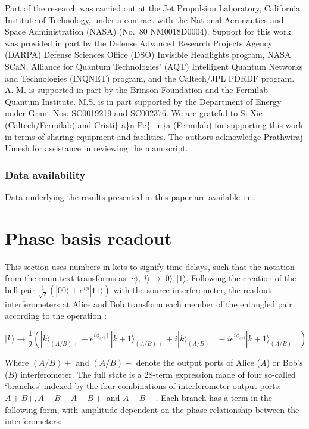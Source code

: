\documentclass[11pt]{caltech_thesis} %
\begin{document}
Part of the research was carried out at the Jet Propulsion Laboratory, California Institute of Technology, under a contract with the National Aeronautics and Space Administration (NASA) (No.~80 NM0018D0004). Support for this work was provided in part by the Defense Advanced Research Projects Agency (DARPA) Defense Sciences Office (DSO) Invisible Headlights program, NASA SCaN, Alliance for Quantum Technologies' (AQT) Intelligent Quantum Networks and Technologies (INQNET) program, and the Caltech/JPL PDRDF program. A. M. is supported in part by the Brinson Foundation and the Fermilab Quantum Institute. M.S. is in part supported by the Department of Energy under Grant Nos. SC0019219 and SC002376. We are grateful to Si Xie (Caltech/Fermilab) and Cristi\{\textquotesingle{} a\}n Pe\{~ n\}a (Fermilab) for supporting this work in terms of sharing equipment and facilities. The authors acknowledge Prathwiraj Umesh for assistance in reviewing the manuscript.

\hypertarget{data-availability}{%
\subsubsection{Data availability}\label{data-availability}}

Data underlying the results presented in this paper are available in \autocite{mueller2023code,mueller2023data}.

\hypertarget{phase-basis-readout}{%
\section{Phase basis readout}\label{phase-basis-readout}}

This section uses numbers in kets to signify time delays, such that the notation from the main text transforms as $|e\rangle, |l\rangle \longrightarrow |0\rangle, |1\rangle$. Following the creation of the bell pair $\frac{1}{\sqrt{2}}(|00\rangle + e^{i \phi}|11\rangle)$ with the source interferometer, the readout interferometers at Alice and Bob transform each member of the entangled pair according to the operation \autocite{Marcikic2002}:

$$|k\rangle \rightarrow \frac{1}{2}\left(|k\rangle_{(A/B)+}+e^{i \phi_{s / i} \mid}|k+1\rangle_{(A/B)+}+i|k\rangle_{(A/B)-}-i e^{i \phi_{s / i}}|k+1\rangle_{(A/B)-}\right)$$

Where $(A/B)+$ and $(A/B)-$ denote the output ports of Alice ($A$) or Bob's ($B$) interferometer. The full state is a 28-term expression made of four so-called `branches' indexed by the four combinations of interferometer output ports: $A+ B+, A+ B- A- B+$ and $A- B-$. Each branch has a term in the following form, with amplitude dependent on the phase relationship between the interferometers:
\end{document}
